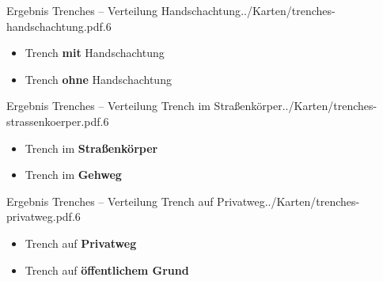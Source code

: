 \documentclass[11pt, dvipsnames,aspectratio=169]{beamer}
\newcommand\colorrule[1]{\tikz{\draw[white,opacity=0] (0,0) -- (0,-.08);\draw[white,opacity=0] (0,0) -- (.58,0);\fill[fill=#1] (0,0) rectangle (.51,.08);}}
\begin{document}
\begin{mapframe}{Ergebnis Trenches -- Verteilung Handschachtung}{../Karten/trenches-handschachtung.pdf}{.6\textwidth}
	\begin{itemize}
		\item[\colorrule{trenchgreen}] Trench \textbf{mit} Handschachtung
		\item[\colorrule{trenchblack}] Trench \textbf{ohne} Handschachtung
	\end{itemize}
\end{mapframe}

\begin{mapframe}{Ergebnis Trenches -- Verteilung Trench im Straßenkörper}{../Karten/trenches-strassenkoerper.pdf}{.6\textwidth}
	\begin{itemize}
		\item[\colorrule{trenchred}] Trench im \textbf{Straßenkörper}
		\item[\colorrule{trenchblack}] Trench im \textbf{Gehweg}
	\end{itemize}
\end{mapframe}

\begin{mapframe}{Ergebnis Trenches -- Verteilung Trench auf Privatweg}{../Karten/trenches-privatweg.pdf}{.6\textwidth}
	\begin{itemize}
		\item[\colorrule{trenchblue}] Trench auf \textbf{Privatweg}
		\item[\colorrule{trenchblack}] Trench auf \textbf{öffentlichem Grund}
	\end{itemize}
\end{mapframe}
\end{document}
